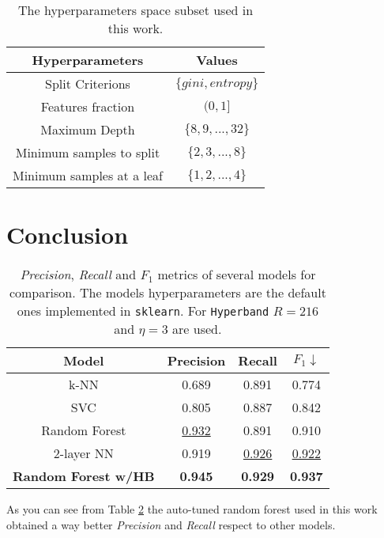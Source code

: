 \documentclass[11pt, a4paper]{article}
\begin{document}
  \begin{table}
    \centering
    \begin{tabular}{|c c|}
      \hline
      Hyperparameters & Values \\
      \hline\hline
      Split Criterions & $\{gini, entropy\}$ \\
      \hline
      Features fraction & $(0, 1]$ \\
      \hline
      Maximum Depth & $\{8,9,...,32\}$ \\
      \hline
      Minimum samples to split & $\{2,3,...,8\}$ \\
      \hline
      Minimum samples at a leaf & $\{1,2,...,4\}$ \\
      \hline
    \end{tabular}
    \caption{The hyperparameters space subset used in this work.}
    \label{table:hyperparameters}
  \end{table}

\section{Conclusion}
\begin{table}
  \centering
  \begin{tabular}{|c c c c|}
    \hline
    Model & Precision & Recall & $F_{1} \downarrow$  \\
    \hline\hline
    k-NN & 0.689 & 0.891 & 0.774 \\
    \hline
    SVC & 0.805 & 0.887 & 0.842 \\
    \hline
    Random Forest & \underline{0.932} & 0.891 & 0.910 \\
    \hline
    2-layer NN & 0.919 & \underline{0.926} & \underline{0.922} \\
    \hline
    \textbf{Random Forest w/HB} & \textbf{0.945} & \textbf{0.929} & \textbf{0.937} \\
    \hline
  \end{tabular}
  \caption{\textit{Precision}, \textit{Recall} and $F_{1}$ metrics of several models for comparison. The models hyperparameters are the default ones implemented in \texttt{sklearn}. For \texttt{Hyperband} $R=216$ and $\eta=3$ are used.}
  \label{table:benchmark}
\end{table}

  As you can see from Table \ref{table:benchmark} the auto-tuned random forest used in this work obtained a way better \textit{Precision} and \textit{Recall} respect to other models.
\end{document}
